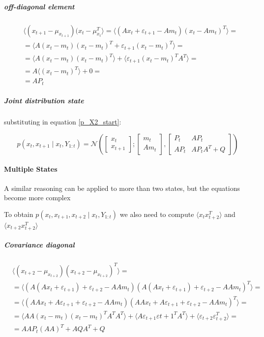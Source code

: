 \documentclass{article}
\newcommand{\E}[1]{\langle #1 \rangle} %
\newcommand{\norm}[3]{\mathcal{N}\left(#1; #2, #3\right)} %
\begin{document}
\subparagraph{off-diagonal element}

\begin{equation}\label{eq:cov_x_t1_x_t}
\begin{split}
    &\E{(x_{t+1}-\mu_{x_{t+1}}) (x_{t}-\mu_{x_{t}}^T} = \E{(Ax_t + \varepsilon_{t+1} -Am_t)(x_t - Am_t)^T} =\\
    &=\E{A(x_t - m_t)(x_t - m_t)^T + \varepsilon_{t+1}(x_t - m_t)^T} =\\&=\E{A(x_t - m_t)(x_t - m_t)^T} + \E{\varepsilon_{t+1}(x_t - m_t)^TA^T} =\\
    &=A\E{(x_t - m_t)^T} + 0 = \\
    &=AP_t
\end{split}
\end{equation}

\subparagraph{Joint distribution state}

substituting in equation \ref{p_X2_start}:

\begin{equation}\label{p_X2_final}
p(x_t, x_{t+1}\mid x_t, Y_{1:t}) = \norm{\begin{bmatrix}x_t\\x_{t+1}\end{bmatrix}}{\begin{bmatrix}m_t\\Am_t\end{bmatrix}}
{\begin{bmatrix}P_t & AP_t\\AP_t & AP_tA^T + Q\end{bmatrix}}
\end{equation}

\paragraph{Multiple States} A similar reasoning can be applied to more than two states, but the equations become more complex

To obtain $p(x_t, x_{t+1}, x_{t+2} \mid x_t, Y_{1:t})$ we also need to compute $\E{x_tx_{t+2}^T}$ and $\E{x_{t+2}x_{t+2}^T}$

\subparagraph{Covariance diagonal}

\begin{equation}\label{eq:cov_x_t_x_t2}
\begin{split}
    &\E{(x_{t+2}-\mu_{x_{t+2}})(x_{t+2}-\mu_{x_{t+2}})^T}=\\
    &= \E{(A(Ax_t + \varepsilon_{t+1}) + \varepsilon_{t+2} - AAm_t)(A(Ax_t + \varepsilon_{t+1}) + \varepsilon_{t+2} - AAm_t)^T} =\\
    &=\E{(AAx_t + A\varepsilon_{t+1} + \varepsilon_{t+2} - AAm_t)(AAx_t + A\varepsilon_{t+1} + \varepsilon_{t+2} - AAm_t)^T}=\\
    &=\E{AA(x_t - m_t)(x_t - m_t)^TA^TA^T} + \E{A\varepsilon_{t+1}\varepsilon{t+1}^TA^T} + \E{\varepsilon_{t+2}\varepsilon_{t+2}^T}=\\
    &=AAP_t(AA)^T + AQA^T + Q
\end{split}
\end{equation}
\end{document}
